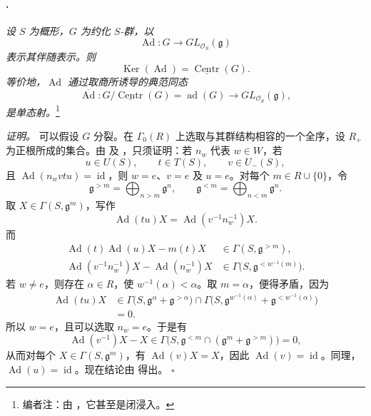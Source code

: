 \paragraph{.}
\textit{设 \(S\) 为概形，\(G\) 为约化 \(S\)-群，以}
\[
  \operatorname{Ad}\colon
  G\longrightarrow GL_{\mathcal O_S}(\mathfrak g)
\]
\textit{表示其伴随表示。则}
\[
  \operatorname{Ker}(\operatorname{Ad})
  =
  \underline{\operatorname{Centr}}(G).
\]
\textit{等价地，\(\operatorname{Ad}\) 通过取商所诱导的典范同态}
\[
  \overline{\operatorname{Ad}}\colon
  G/\underline{\operatorname{Centr}}(G)
  =
  \operatorname{ad}(G)
  \longrightarrow
  GL_{\mathcal O_S}(\mathfrak g),
\]
\textit{是单态射。}\footnote{编者注：由 \textup{}，它甚至是闭浸入。}

\textit{证明。}
可以假设 \(G\) 分裂。在 \(\Gamma_0(R)\) 上选取与其群结构相容的一个全序，设 \(R_+\) 为正根所成的集合。由  \textup{} 及 ，只须证明：若 \(n_w\) 代表 \(w\in W\)，若
\[
  u\in U(S),\qquad t\in T(S),\qquad v\in U_-(S),
\]
且 \(\operatorname{Ad}(n_wvtu)=\operatorname{id}\)，则 \(w=e\)、\(v=e\) 及 \(u=e\)。对每个 \(m\in R\cup\{0\}\)，令
\[
  \mathfrak g^{>m}
  =
  \bigoplus_{n>m}\mathfrak g^n,
  \qquad
  \mathfrak g^{<m}
  =
  \bigoplus_{n<m}\mathfrak g^n.
\]
取 \(X\in\Gamma(S,\mathfrak g^m)\)，写作
\[
  \operatorname{Ad}(tu)X
  =
  \operatorname{Ad}(v^{-1}n_w^{-1})X.
\]
而
\[
\begin{aligned}
  \operatorname{Ad}(t)\operatorname{Ad}(u)X-m(t)X
  &\in\Gamma(S,\mathfrak g^{>m}),\\
  \operatorname{Ad}(v^{-1}n_w^{-1})X
  -\operatorname{Ad}(n_w^{-1})X
  &\in\Gamma\bigl(S,\mathfrak g^{<w^{-1}(m)}\bigr).
\end{aligned}
\]
若 \(w\ne e\)，则存在 \(\alpha\in R\)，使 \(w^{-1}(\alpha)<\alpha\)。取 \(m=\alpha\)，便得矛盾，因为
\[
\begin{aligned}
  \operatorname{Ad}(tu)X
  &\in
  \Gamma\bigl(S,\mathfrak g^\alpha+\mathfrak g^{>\alpha}\bigr)
  \cap
  \Gamma\bigl(
    S,
    \mathfrak g^{w^{-1}(\alpha)}
    +\mathfrak g^{<w^{-1}(\alpha)}
  \bigr)\\
  &=0.
\end{aligned}
\]
所以 \(w=e\)，且可以选取 \(n_w=e\)。于是有
\[
  \operatorname{Ad}(v^{-1})X-X
  \in
  \Gamma\bigl(
    S,
    \mathfrak g^{<m}\cap
    (\mathfrak g^m+\mathfrak g^{>m})
  \bigr)
  =0,
\]
从而对每个 \(X\in\Gamma(S,\mathfrak g^m)\)，有 \(\operatorname{Ad}(v)X=X\)，因此 \(\operatorname{Ad}(v)=\operatorname{id}\)。同理，\(\operatorname{Ad}(u)=\operatorname{id}\)。现在结论由  得出。
\hfill\(\square\)

